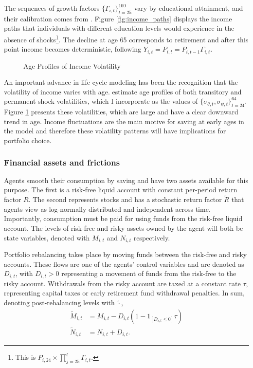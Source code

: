 \documentclass[./RiskyContrib.tex]{subfiles}
\begin{document}
The sequences of growth factors $\{\Gamma_{i,t}\}_{t=25}^{100}$ vary by educational attainment,
and their calibration comes from \cite{Cagetti2003jbes}. Figure \ref{fig:income_paths}
displays the income paths that individuals with different education levels would experience
in the absence of shocks\footnote{This is $P_{i,24}\times\prod_{j=25}^{t} \Gamma_{i,t}$.}. The
decline at age 65 corresponds to retirement and after this point income becomes deterministic,
following $Y_{i,t} = P_{i,t} = P_{i,t-1}\Gamma_{i,t}$.

\begin{figure}
\begin{center}
\caption{Age Profiles of Income Volatility}\label{fig:volat_paths}
\end{center}
\end{figure}

An important advance in life-cycle modeling has been the recognition that
the volatility of income varies with age. \cite{Sabelhaus2010jme} estimate
age profiles of both transitory and permanent shock volatilities, which I
incorporate as the values of $\{\sigma_{\theta,t}, \sigma_{\psi,t}\}_{t=24}^{64}$.
Figure \ref{fig:volat_paths} presents these volatilities, which are large and have
a clear downward trend in age. Income fluctuations are the main motive for saving
at early ages in the model and therefore these volatility patterns will have
implications for portfolio choice.

\subsubsection{Financial assets and frictions}\label{sec:fin_frictions}

Agents smooth their consumption by saving and have two assets
available for this purpose. The first is a risk-free liquid account with 
constant per-period return factor $R$. The second represents stocks
and has a stochastic return factor $\tilde{R}$ that agents view as 
log-normally distributed and independent across time. Importantly,
consumption must be paid for using funds from the risk-free liquid account.
The levels of risk-free and risky assets owned by the agent will both be state
variables, denoted with $M_{i,t}$ and $N_{i,t}$ respectively.

Portfolio rebalancing takes place by moving funds between the risk-free
and risky accounts. These flows are one of the agents' control variables
and are denoted as $D_{i,t}$, with $D_{i,t}>0$ representing a movement of
funds from the risk-free to the risky account. Withdrawals from the risky
account are taxed at a constant rate $\tau$, representing capital taxes or
early retirement fund withdrawal penalties. In sum, denoting post-rebalancing
levels with
$\tilde{\cdot}$,
\begin{equation*}
\begin{split}
\tilde{M}_{i,t} &= M_{i,t} - D_{i,t}(1 - 1_{[D_{i,t}\leq0]}\tau)\\
\tilde{N}_{i,t} &= N_{i,t} + D_{i,t}.
\end{split}
\end{equation*}
\end{document}
